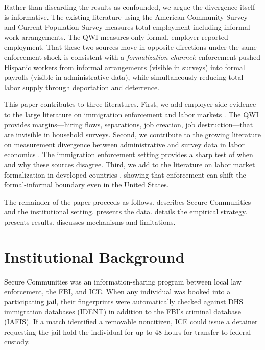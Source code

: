 \documentclass[12pt]{article}
\begin{document}
Rather than discarding the results as confounded, we argue the divergence itself is informative. The existing literature using the American Community Survey and Current Population Survey \citep{east2023labor,alsan2022fear,amuedo2023immigration} measures total employment including informal work arrangements. The QWI measures only formal, employer-reported employment. That these two sources move in opposite directions under the same enforcement shock is consistent with a \textit{formalization channel}: enforcement pushed Hispanic workers from informal arrangements (visible in surveys) into formal payrolls (visible in administrative data), while simultaneously reducing total labor supply through deportation and deterrence.

This paper contributes to three literatures. First, we add employer-side evidence to the large literature on immigration enforcement and labor markets \citep{east2023labor,alsan2022fear,bohn2015did,orrenius2015behind,amuedo2023immigration,watson2014inside}. The QWI provides margins---hiring flows, separations, job creation, job destruction---that are invisible in household surveys. Second, we contribute to the growing literature on measurement divergence between administrative and survey data in labor economics \citep{abraham2013reconciling,flood2020reconciling,bollinger2019trouble}. The immigration enforcement setting provides a sharp test of when and why these sources disagree. Third, we add to the literature on labor market formalization in developed countries \citep{meghir2015wages,ulyssea2018firms,lehmann2012informal}, showing that enforcement can shift the formal-informal boundary even in the United States.

The remainder of the paper proceeds as follows.  describes Secure Communities and the institutional setting.  presents the data.  details the empirical strategy.  presents results.  discusses mechanisms and limitations.


\section{Institutional Background}
\label{sec:background}

Secure Communities was an information-sharing program between local law enforcement, the FBI, and ICE. When any individual was booked into a participating jail, their fingerprints were automatically checked against DHS immigration databases (IDENT) in addition to the FBI's criminal database (IAFIS). If a match identified a removable noncitizen, ICE could issue a detainer requesting the jail hold the individual for up to 48 hours for transfer to federal custody.
\end{document}
